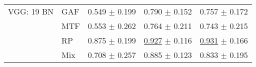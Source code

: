 \begin{tabular}{lllll}
VGG: 19 BN & GAF & \textcolor[rgb]{0.8358563372,0.1641436628,0}{0.549} $\pm$ \textcolor[rgb]{0.7618477893,0.2381522107,0}{0.199} & \textcolor[rgb]{0.8699186992,0.1300813008,0}{0.790} $\pm$ \textcolor[rgb]{0.6304392736,0.3695607264,0}{0.152} & \textcolor[rgb]{0.7948717949,0.2051282051,0}{0.757} $\pm$ \textcolor[rgb]{0.4708846452,0.5000000000,0}{0.172} \\
 & MTF & \textcolor[rgb]{0.8254674978,0.1745325022,0}{0.553} $\pm$ \textcolor[rgb]{1.0000000000,0.0000000000,0}{0.262} & \textcolor[rgb]{1.0000000000,0.0000000000,0}{0.764} $\pm$ \textcolor[rgb]{1.0000000000,0.0000000000,0}{0.211} & \textcolor[rgb]{0.8461538462,0.1538461538,0}{0.743} $\pm$ \textcolor[rgb]{0.7343347100,0.2656652900,0}{0.215} \\
 & RP & \textcolor[rgb]{0.0685663402,0.5000000000,0}{0.875} $\pm$ \textcolor[rgb]{0.7623521573,0.2376478427,0}{0.199} & \underline{\textcolor[rgb]{0.1666666667,0.5000000000,0}{0.927}} $\pm$ \textcolor[rgb]{0.4030274280,0.5000000000,0}{0.116} & \underline{\textcolor[rgb]{0.1538461538,0.5000000000,0}{0.931}} $\pm$ \textcolor[rgb]{0.4332280526,0.5000000000,0}{0.166} \\
 & Mix & \textcolor[rgb]{0.4603739982,0.5000000000,0}{0.708} $\pm$ \textcolor[rgb]{0.9841924031,0.0158075969,0}{0.257} & \textcolor[rgb]{0.3821138211,0.5000000000,0}{0.885} $\pm$ \textcolor[rgb]{0.4457804883,0.5000000000,0}{0.123} & \textcolor[rgb]{0.5128205128,0.4871794872,0}{0.833} $\pm$ \textcolor[rgb]{0.6106582296,0.3893417704,0}{0.195} \\
\bottomrule
\end{tabular}

